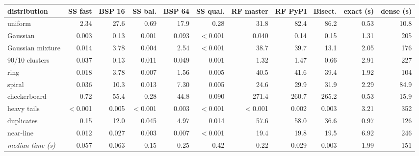 \begin{tabular}{lrrrrrrrrrr}
\toprule
distribution & SS fast & BSP 16 & SS bal. & BSP 64 & SS qual. & RF master & RF PyPI & Bisect. & exact (s) & dense (s) \\
\midrule
uniform & 2.34 & 27.6 & 0.69 & 17.9 & 0.28 & 31.8 & 82.4 & 86.2 & 0.53 & 10.8 \\
Gaussian & 0.003 & 0.13 & 0.001 & 0.093 & $<$0.001 & 0.040 & 0.14 & 0.15 & 1.31 & 205 \\
Gaussian mixture & 0.014 & 3.78 & 0.004 & 2.54 & $<$0.001 & 38.7 & 39.7 & 13.1 & 2.05 & 176 \\
90/10 clusters & 0.037 & 0.13 & 0.011 & 0.049 & 0.001 & 1.32 & 1.47 & 0.66 & 2.91 & 227 \\
ring & 0.018 & 3.78 & 0.007 & 1.56 & 0.005 & 40.5 & 41.6 & 39.4 & 1.92 & 104 \\
spiral & 0.036 & 10.3 & 0.013 & 7.30 & 0.005 & 24.6 & 29.9 & 31.9 & 2.29 & 84.9 \\
checkerboard & 0.72 & 55.4 & 0.28 & 44.8 & 0.090 & 271.4 & 260.7 & 265.2 & 0.53 & 15.9 \\
heavy tails & $<$0.001 & 0.005 & $<$0.001 & 0.003 & $<$0.001 & $<$0.001 & 0.002 & 0.003 & 3.21 & 352 \\
duplicates & 0.15 & 12.0 & 0.045 & 4.97 & 0.014 & 57.6 & 58.0 & 36.6 & 0.97 & 126 \\
near-line & 0.012 & 0.027 & 0.003 & 0.007 & $<$0.001 & 19.4 & 19.8 & 19.5 & 6.92 & 246 \\
\midrule
\emph{median time (s)} & 0.057 & 0.063 & 0.15 & 0.25 & 0.42 & 0.22 & 0.029 & 0.003 & 1.99 & 151 \\
\bottomrule
\end{tabular}
